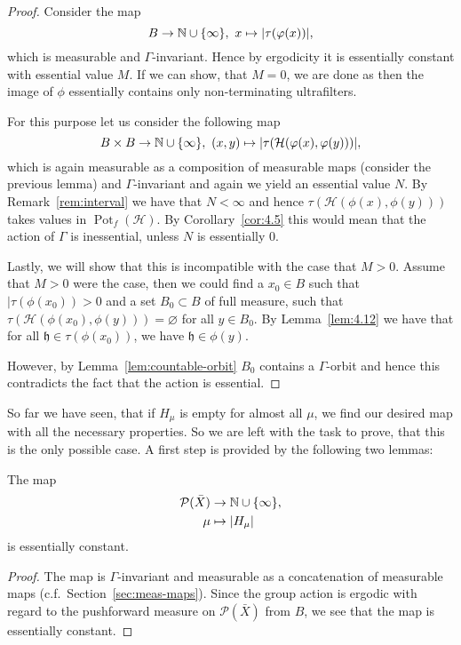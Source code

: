 \begin{proof}
  Consider the map
  \[
    B \to \mathbb{N} \cup \{\infty\},\ x \mapsto |\tau(\varphi(x))|,
  \]
  which is measurable and \(\Gamma\)-invariant. Hence by ergodicity it is essentially constant with essential value \(M\). If we can show, that \(M = 0\), we are done as then the image of \(\phi\) essentially contains only non-terminating ultrafilters.

  For this purpose let us consider the following map
  \[
    B \times B \to \mathbb{N} \cup \{\infty\},\ (x,y) \mapsto |\tau(\mathcal{H}(\varphi(x), \varphi(y)))|,
  \]
  which is again measurable as a composition of measurable maps (consider the previous lemma) and \(\Gamma\)-invariant and again we yield an essential value \(N\). By Remark~\ref{rem:interval} we have that \(N < \infty\) and hence \(\tau(\mathcal{H}(\phi(x), \phi(y)))\) takes values in \(\operatorname{Pot}_f(\mathcal{H})\). By Corollary~\ref{cor:4.5} this would mean that the action of \(\Gamma\) is inessential, unless \(N\) is essentially 0.

  Lastly, we will show that this is incompatible with the case that \(M > 0\). Assume that \(M > 0\) were the case, then we could find a \(x_0 \in B\) such that \(|\tau(\phi(x_0)) > 0\) and a set \(B_0 \subset B\) of full measure, such that \(\tau(\mathcal{H}(\phi(x_0), \phi(y))) = \varnothing\) for all \(y \in B_0\). By Lemma~\ref{lem:4.12} we have that for all \(\mathfrak{h} \in \tau(\phi(x_0))\), we have \(\mathfrak{h} \in \phi(y)\).

  However, by Lemma~\ref{lem:countable-orbit} \(B_0\) contains a \(\Gamma\)-orbit and hence this contradicts the fact that the action is essential.
\end{proof}

So far we have seen, that if \(H_\mu\) is empty for almost all \(\mu\), we find our desired map with all the necessary properties. So we are left with the task to prove, that this is the only possible case. A first step is provided by the following two lemmas:

\begin{lemma}
  \label{lem:h-const}
  The map
  \begin{align*}
    \mathcal{P}(\bar X) &\to \mathbb{N} \cup \{\infty\},\\
    \mu &\mapsto |H_\mu|
  \end{align*}
  is essentially constant.
\end{lemma}

\begin{proof}
  The map is \(\Gamma\)-invariant and measurable as a concatenation of measurable maps (c.f.~Section~\ref{sec:meas-maps}). Since the group action is ergodic with regard to the pushforward measure on \(\mathcal{P}(\bar X)\) from \(B\), we see that the map is essentially constant.
\end{proof}

